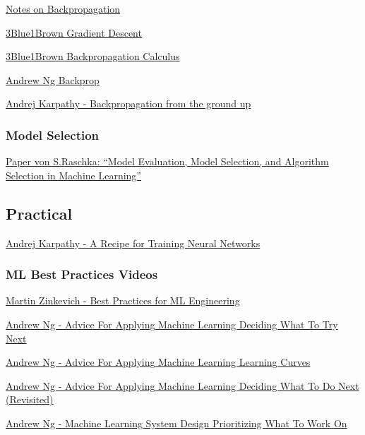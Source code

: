 \documentclass[
  letterpaper,
  DIV=11,
  numbers=noendperiod]{scrartcl}
\begin{document}
\href{https://www.ics.uci.edu/~pjsadows/notes.pdf}{Notes on
Backpropagation}

\href{https://youtu.be/IHZwWFHWa-w}{3Blue1Brown Gradient Descent}

\href{https://www.youtube.com/watch?v=tIeHLnjs5U8}{3Blue1Brown
Backpropagation Calculus}

\href{https://youtu.be/mO7BpWmzT78}{Andrew Ng Backprop}

\href{https://www.youtube.com/watch?v=VMj-3S1tku0}{Andrej Karpathy -
Backpropagation from the ground up}

\subsubsection{Model Selection}\label{model-selection}

\href{https://arxiv.org/pdf/1811.12808.pdf}{Paper von S.Raschka: ``Model
Evaluation, Model Selection, and Algorithm Selection in Machine
Learning''}

\subsection{Practical}\label{practical}

\href{http://karpathy.github.io/2019/04/25/recipe/}{Andrej Karpathy - A
Recipe for Training Neural Networks}

\subsubsection{ML Best Practices Videos}\label{ml-best-practices-videos}

\href{https://developers.google.com/machine-learning/guides/rules-of-ml}{Martin
Zinkevich - Best Practices for ML Engineering}

\href{https://www.youtube.com/watch?v=sZSKGNbrwus&list=PLLssT5z_DsK-h9vYZkQkYNWcItqhlRJLN&index=59}{Andrew
Ng - Advice For Applying Machine Learning \textbar{} Deciding What To
Try Next}

\href{https://www.youtube.com/watch?v=ISBGFY-gBug&list=PLLssT5z_DsK-h9vYZkQkYNWcItqhlRJLN&index=64}{Andrew
Ng - Advice For Applying Machine Learning \textbar{} Learning Curves}

\href{https://www.youtube.com/watch?v=yoYA1MFpYRg&list=PLLssT5z_DsK-h9vYZkQkYNWcItqhlRJLN&index=64}{Andrew
Ng - Advice For Applying Machine Learning \textbar{} Deciding What To Do
Next (Revisited)}

\href{https://www.youtube.com/watch?v=HREeLryOh4Q&list=PLLssT5z_DsK-h9vYZkQkYNWcItqhlRJLN&index=65}{Andrew
Ng - Machine Learning System Design \textbar{} Prioritizing What To Work
On}
\end{document}
